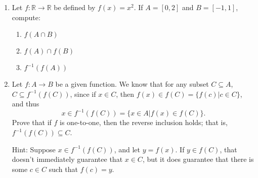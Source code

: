 \documentclass[12pt]{article}
\newcommand{\points}[1]{\marginpar{\hspace{24pt}[#1]}}
\newcommand{\R}{\mathbb{R}}
\begin{document}
\thispagestyle{fancy}

 \begin{enumerate}
 \item Let $f:\R\to\R$ be defined by $f(x)=x^2$. If $A=[0,2]$ and $B=[-1,1]$, compute:
\begin{enumerate}
 \item $f(A\cap B)$\points{2}

\vspace{2in}

 \item $f(A)\cap f(B)$\points{2}

\vspace{2in}

 \item $f^{-1}(f(A))$\points{2}
\end{enumerate}
\newpage

\item Let $f:A\to B$ be a given function. We know that for any subset $C\subseteq A$, $C\subseteq f^{-1}(f(C))$, since if $x\in C$, then $f(x)\in f(C)=\{f(c)|c\in C\}$, and thus 
\[
x\in f^{-1}(f(C))=\{x\in A | f(x)\in f(C)\}. 
\]
Prove that if $f$ is one-to-one, then the reverse inclusion holds; that is, $f^{-1}(f(C))\subseteq C$.\points{4}

Hint: Suppose $x\in f^{-1}(f(C))$, and let $y= f(x)$. If $y\in f(C)$, that doesn't immediately guarantee that $x\in C$, but it does guarantee that there is some $c\in C$ such that $f(c)=y$.

 \end{enumerate}
\end{document}
